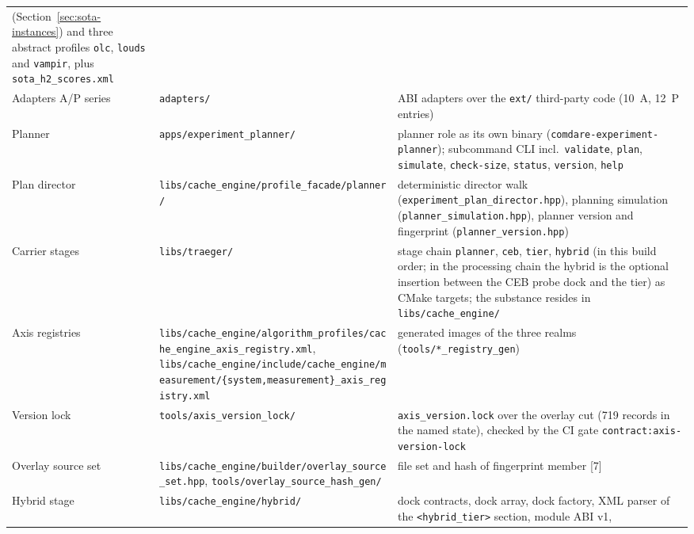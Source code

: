 {\begin{longtable}{@{}>{\raggedright\arraybackslash}p{}>{\raggedright\arraybackslash}p{}>{\raggedright\arraybackslash}p{}@{}}
(Section~\ref{sec:sota-instances}) and three abstract profiles \texttt{olc}, \texttt{louds} and
\texttt{vampir}, plus \texttt{sota\_\allowbreak{}h2\_\allowbreak{}scores.xml} \\
Adapters A/P series &
\texttt{adapters/} &
ABI adapters over the \texttt{ext/} third-party code (10~A, 12~P entries) \\
Planner &
\texttt{apps/\allowbreak{}experiment\_planner/} &
planner role as its own binary (\texttt{comdare-\allowbreak{}experiment-\allowbreak{}planner});
subcommand CLI incl.\ \texttt{validate}, \texttt{plan}, \texttt{simulate}, \texttt{check-size},
\texttt{status}, \texttt{version}, \texttt{help} \\
Plan director &
\texttt{libs/\allowbreak{}cache\_engine/\allowbreak{}profile\_facade/\allowbreak{}planner/} &
deterministic director walk (\texttt{experiment\_\allowbreak{}plan\_\allowbreak{}director.hpp}),
planning simulation (\texttt{planner\_\allowbreak{}simulation.hpp}), planner version and fingerprint
(\texttt{planner\_\allowbreak{}version.hpp}) \\
Carrier stages &
\texttt{libs/\allowbreak{}traeger/} &
stage chain \texttt{planner}, \texttt{ceb}, \texttt{tier}, \texttt{hybrid} (in this build order; in the
processing chain the hybrid is the optional insertion between the CEB probe dock and the tier) as
CMake targets; the substance resides in \texttt{libs/\allowbreak{}cache\_engine/} \\
Axis registries &
\texttt{libs/\allowbreak{}cache\_engine/\allowbreak{}algorithm\_profiles/\allowbreak{}cache\_engine\_axis\_registry.xml},
\texttt{libs/\allowbreak{}cache\_engine/\allowbreak{}include/\allowbreak{}cache\_engine/\allowbreak{}measurement/\allowbreak{}\{system,\allowbreak{}measurement\}\_axis\_registry.xml} &
generated images of the three realms (\texttt{tools/\allowbreak{}*\_registry\_gen}) \\
Version lock &
\texttt{tools/\allowbreak{}axis\_version\_lock/} &
\texttt{axis\_\allowbreak{}version.lock} over the overlay cut (719 records in the named state),
checked by the CI gate \texttt{contract:\allowbreak{}axis-version-lock} \\
Overlay source set &
\texttt{libs/\allowbreak{}cache\_engine/\allowbreak{}builder/\allowbreak{}overlay\_source\_set.hpp},
\texttt{tools/\allowbreak{}overlay\_source\_hash\_gen/} &
file set and hash of fingerprint member [7] \\
Hybrid stage &
\texttt{libs/\allowbreak{}cache\_engine/\allowbreak{}hybrid/} &
dock contracts, dock array, dock factory, XML parser of the \texttt{<hybrid\_tier>} section, module ABI v1,

\end{longtable}}

